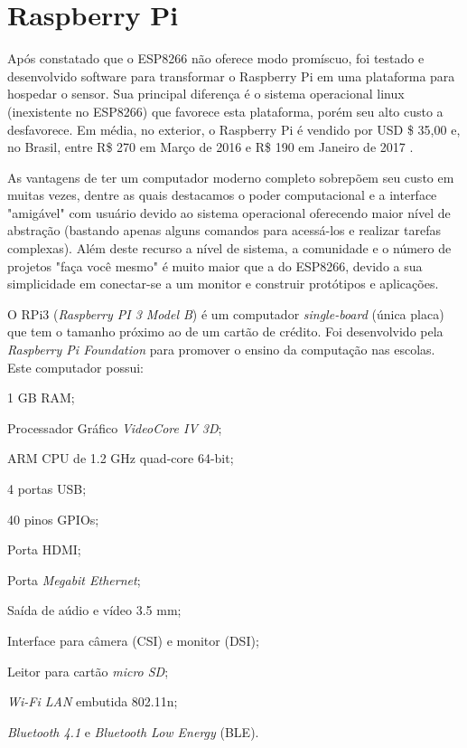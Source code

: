 
\section{Raspberry Pi}
\label{sec:Raspberry-Pi}

Após constatado que o ESP8266 não oferece modo promíscuo, foi testado e
desenvolvido software para transformar o Raspberry Pi em uma plataforma para
hospedar o sensor. Sua principal diferença é o sistema operacional linux
(inexistente no ESP8266) que favorece esta plataforma, porém seu alto custo a
desfavorece. Em média, no exterior, o Raspberry Pi é vendido por USD \$ 35,00
\cite{RPI2016} e, no Brasil, entre R\$ 270 em Março de 2016 e R\$ 190 em Janeiro
de 2017 \cite{rpi3-mercadolivre}.

As vantagens de ter um computador moderno completo sobrepõem seu custo em muitas
vezes, dentre as quais destacamos o poder computacional e a interface "amigável"  com usuário devido ao
sistema operacional oferecendo maior nível de abstração (bastando apenas alguns
comandos para acessá-los e realizar tarefas complexas).
Além deste recurso a nível de sistema, a comunidade e o número de projetos "faça
você mesmo"  é muito maior que a do ESP8266, devido a sua simplicidade em
conectar-se a um monitor e construir protótipos e aplicações.

O RPi3 (\emph{Raspberry PI 3 Model B}) é um computador \emph{single-board}  (única
placa) que tem o tamanho próximo ao de um cartão de crédito. Foi desenvolvido
pela \emph{Raspberry Pi Foundation} para promover o ensino da computação nas
escolas. Este computador possui:


\begin{alineas}
	\item 1 GB RAM;

	\item Processador Gráfico \emph{VideoCore IV 3D};

	\item ARM CPU de 1.2 GHz quad-core 64-bit;

	\item 4 portas USB;

	\item 40 pinos GPIOs;

	\item Porta HDMI;

	\item Porta \emph{Megabit Ethernet};

	\item Saída de aúdio e vídeo 3.5 mm;

	\item Interface para câmera (CSI) e monitor (DSI);

	\item Leitor para cartão \emph{micro SD};

	\item \emph{Wi-Fi LAN} embutida 802.11n;

	\item \emph{Bluetooth 4.1} e \emph{Bluetooth Low Energy} (BLE).

\end{alineas}

